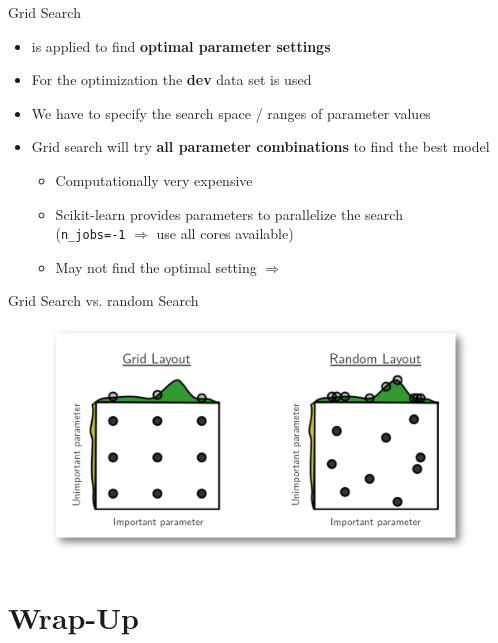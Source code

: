 \begin{frame}{Grid Search}{}
	\begin{itemize}
		\item {} is applied to find \textbf{optimal parameter settings}
		\item For the optimization the \textbf{dev} data set is used
		\item We have to specify the search space / ranges of parameter values
		\item Grid search will try \textbf{all parameter combinations} to find the best model
		\begin{itemize}
			\item Computationally very expensive
			\item Scikit-learn provides parameters to parallelize the search \\
				(\texttt{n\_jobs=-1} $\Rightarrow$ use all cores available)
			\item May not find the optimal setting $\Rightarrow$ 
		\end{itemize}
	\end{itemize}
\end{frame}


\begin{frame}{Grid Search vs. random Search}{}
	\begin{figure}
		\centering
		\includegraphics[scale=0.25]{09_evaluation/02_img/grid_random_search}
	\end{figure}
\end{frame}


\section{Wrap-Up}

